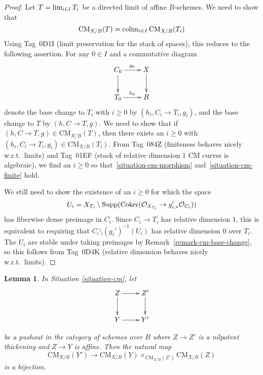 \documentclass{stacks-project}
\theoremstyle{plain}
\newtheorem{lemma}[subsection]{Lemma}
\theoremstyle{definition}
\theoremstyle{remark}
\numberwithin{equation}{subsection}
\def\lim{\mathop{\rm lim}\nolimits}
\def\colim{\mathop{\rm colim}\nolimits}
\def\Coker{\mathop{\rm Coker}}
\def\CMfunctor{\mathcal{C}\!{\it oh}}
\def\CMfunctor{\text{CM}}
\begin{document}
\begin{proof}
Let $T = \lim_{i \in I} T_i$ be a directed limit of affine $B$-schemes. We need to show that
$$
\CMfunctor_{X/B}(T) = \colim_{i \in I} \CMfunctor_{X/B}(T_i)
$$
Using Tag~0D1I (limit preservation for the stack of spaces), this reduces to the following assertion. For any $0 \in I$ and a commutative diagram
$$
\xymatrix{
C_0 \ar[r]^{g_0} \ar[d] &X \ar[d] \\
T_0 \ar[r]^{h_0} & B
}
$$
    denote the base change to $T_i$ with $i \geq 0$ by $(h_i,C_i \rightarrow T_i,g_i)$, and the base change to $T$ by $(h,C \rightarrow T,g)$. We need to show that if $(h,C \rightarrow T,g) \in \CMfunctor_{X/B}(T)$, then there exists an $i \geq 0$ with $(h_i, C_i \rightarrow T_i, g_i) \in \CMfunctor_{X/B}(T_i)$. From Tag~084Z (finiteness behaves nicely w.r.t.\ limits) and Tag~01EF (stack of relative dimension 1 CM curves is algebraic), we find an $i \geq 0$ so that~\eqref{situation-cm-morphism} and~\eqref{situation-cm-finite} hold.

\medskip\noindent
We still need to show the existence of an $i \geq 0$ for which the space
$$
U_i = X_{T_i} \setminus \text{Supp}(\Coker(\mathcal{O}_{X_{T_i}} \rightarrow g'_{i,*} \mathcal{O}_{C_i}))
$$
has fiberwise dense preimage in $C_i$. Since $C_i \rightarrow T_i$ has relative dimension $1$, this is equivalent to requiring that $C_i \setminus (g_i')^{-1} (U_i)$ has relative dimension $0$ over $T_i$. The $U_i$ are stable under taking preimages by Remark~\ref{remark-cm-base-change}, so this follows from Tag~0D4K (relative dimension behaves nicely w.r.t.\ limits).
\end{proof}


\begin{lemma}
In Situation \ref{situation-cm}, let 
$$
\xymatrix{
Z \ar[r] \ar[d] & Z' \ar[d] \\
Y \ar[r] & Y'}
$$

be a pushout in the category of schemes over $B$ where $Z\to Z'$ is a nilpotent thickening and $Z \to Y$ is affine. Then the natural map
$$
\CMfunctor_{X/B}(Y') \longrightarrow \CMfunctor_{X/B}(Y) \times_{\CMfunctor_{X/B}(Z')} \CMfunctor_{X/B}(Z)
$$ is a bijection.

\label{lemma-cm-RS-star}
\end{lemma}
\end{document}
